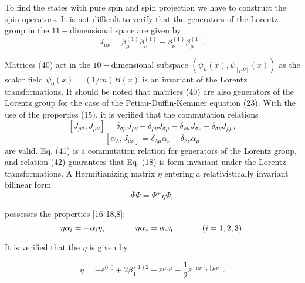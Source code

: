 \documentclass[a4paper,12pt]{article}
\begin{document}
To find the states with pure spin and spin projection we have to
construct the spin operators. It is not difficult to verify that
the generators of the Lorentz group in the $11-$dimensional space
are given by
\begin{equation}
J_{\mu \nu }=\beta _\mu ^{(1)}\beta _\nu ^{(1)}-\beta _\nu
^{(1)}\beta _\mu ^{(1)}.  \label{40}
\end{equation}

Matrices (40) act in the $10-$dimensional subspace $\left(\psi
_\mu (x) ,\psi_{[\mu \nu]}(x)\right)$ as the scalar field $\psi_0
(x)= (1/m)B(x)$ is an invariant of the Lorentz transformations. It
should be noted that matrices (40) are also generators of the
Lorentz group for the case of the Petiau-Duffin-Kemmer equation
(23). With the use of the properties (15), it is verified that the
commutation relations
\begin{equation}
\left[ J_{\rho \sigma },J_{\mu \nu }\right] =\delta _{\sigma \mu
}J_{\rho \nu }+\delta _{\rho \nu }J_{\sigma \mu }-\delta _{\rho
\mu }J_{\sigma \nu }-\delta _{\sigma \nu }J_{\rho \mu },
\label{41}
\end{equation}
\begin{equation}
\left[ \alpha _\lambda ,J_{\mu \nu }\right] =\delta _{\lambda \mu
}\alpha _\nu -\delta _{\lambda \nu }\alpha _\mu  \label{42}
\end{equation}
are valid.  Eq. (41) is a commutation relation for generators of
the Lorentz group, and relation (42) guarantees that Eq. (18) is
form-invariant under the Lorentz transformations. A Hermitianizing
matrix $\eta $ entering a relativistically invariant bilinear form
\begin{equation}
\overline{\Psi }\Psi =\Psi ^{+}\eta \Psi,  \label{43}
\end{equation}

possesses the properties [16-18,8]:
\begin{equation}
\eta \alpha _i=-\alpha _i\eta ,\hspace{0.5in}\eta \alpha _4=\alpha
_4\eta \hspace{0.5in}(i=1,2,3).  \label{44}
\end{equation}

It is verified that the $\eta$ is given by

\begin{equation}
\eta =-\varepsilon ^{0,0}+2\beta _4^{(1)2}-\varepsilon ^{\mu ,\mu
}-\frac 12\varepsilon ^{[\mu \nu ],[\mu \nu ]}. \label{45}
\end{equation}
\end{document}
